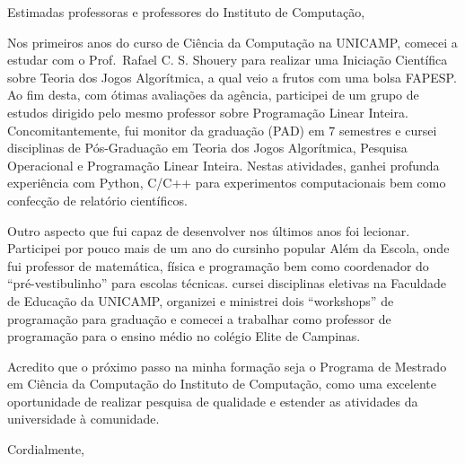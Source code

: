 \documentclass{letter}
\begin{document}
\begin{letter}{}
\opening{Estimadas professoras e professores do Instituto de Computação,}


Nos primeiros anos do curso de Ciência da Computação na UNICAMP, comecei a estudar com o Prof.\ Rafael C. S. Shouery para realizar uma Iniciação Científica sobre Teoria dos Jogos Algorítmica, a qual veio a frutos com uma bolsa FAPESP.
Ao fim desta, com ótimas avaliações da agência, participei de um grupo de estudos dirigido pelo mesmo professor sobre Programação Linear Inteira.
Concomitantemente, fui monitor da graduação (PAD) em \(7\) semestres e cursei disciplinas de Pós-Graduação em Teoria dos Jogos Algorítmica, Pesquisa Operacional e Programação Linear Inteira.
Nestas atividades, ganhei profunda experiência com Python, C/C++ para experimentos computacionais bem como confecção de relatório científicos.

Outro aspecto que fui capaz de desenvolver nos últimos anos foi lecionar. %
Participei por pouco mais de um ano do cursinho popular Além da Escola, onde fui professor de matemática, física e programação bem como coordenador do ``pré-vestibulinho'' para escolas técnicas.
cursei disciplinas eletivas na Faculdade de Educação da UNICAMP, organizei e ministrei dois ``workshops'' de programação para graduação e comecei a trabalhar como professor de programação para o ensino médio no colégio Elite de Campinas.

Acredito que o próximo passo na minha formação seja o Programa de Mestrado em Ciência da Computação do Instituto de Computação, como uma excelente oportunidade de realizar pesquisa de qualidade e estender as atividades da universidade à comunidade.

\closing{Cordialmente,}
\end{letter}
\end{document}
